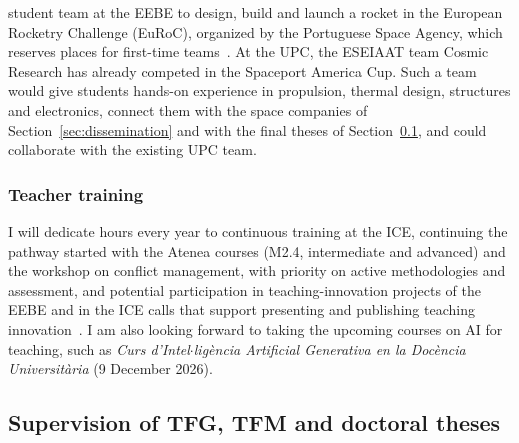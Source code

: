 \documentclass[11pt]{article}
\begin{document}
\begin{itemize}
{  student team at the EEBE to design, build and launch a rocket in the European Rocketry Challenge
  (EuRoC), organized by the Portuguese Space Agency, which reserves places for first-time
  teams~\cite{EuRoC2026}. At the UPC, the ESEIAAT team Cosmic Research has already competed in the
  Spaceport America Cup. Such a team would give students hands-on experience
  in propulsion, thermal design, structures and electronics, connect them with the space companies of
  Section~\ref{sec:dissemination} and with the final theses of Section~\ref{sec:theses}, and could
  collaborate with the existing UPC team.}
\end{itemize}


\subsubsection{Teacher training}

I will dedicate hours every year to continuous training at the ICE, continuing the pathway started with the Atenea courses (M2.4, intermediate and advanced) and the workshop on conflict management, with priority on active methodologies and assessment, and potential participation in teaching-innovation projects of the EEBE and in the ICE calls that support presenting and publishing teaching innovation~\cite{ICEAjuts2025}. I am also looking forward to taking the upcoming courses on AI for teaching, such as \textit{Curs d'Intel$\cdot$lig\`encia Artificial Generativa en la Doc\`encia Universit\`aria} (9 December 2026).


\subsection{Supervision of TFG, TFM and doctoral theses}\label{sec:theses}
\end{document}
